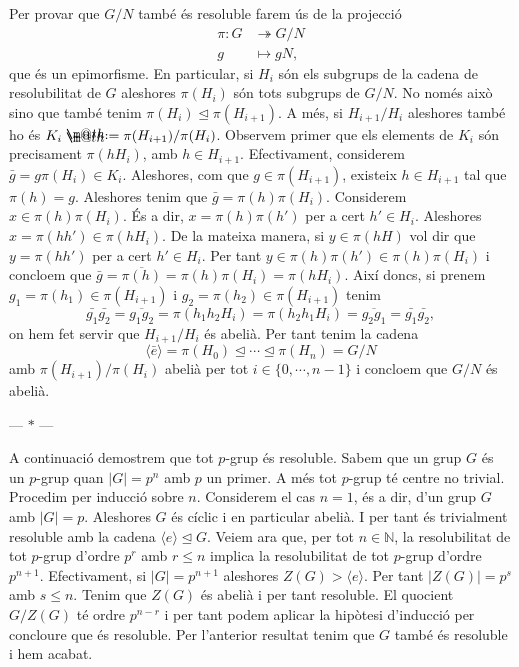 \documentclass[12pt]{article}
\makeatletter
\newcommand{\N}{\mathbb{N}}
\newcommand{\gen}[1]{\langle #1 \rangle}
\newcommand{\abs}[1]{\left\lvert #1 \right\rvert}
\newcommand{\normal}{\trianglelefteq}
\newcommand{\parbreak}{
	\begin{center}
		--- $\ast$ ---
	\end{center} 
}
\newcommand*{\defeq}{\mathrel{\rlap{%
    \raisebox{0.3ex}{$\m@th\cdot$}}%
  \raisebox{-0.3ex}{$\m@th\cdot$}}%
=}
\makeatother
\begin{document}
Per provar que \( G/N \) també és resoluble farem ús de la projecció
\begin{align*}
	\pi \colon G & \twoheadrightarrow G/N \\
	g & \mapsto gN,
\end{align*}
que és un epimorfisme. En particular, si \( H_i \) són els subgrups de la cadena de resolubilitat de \( G \) aleshores \( \pi(H_i) \) són tots subgrups de \( G/N \). No només això sino que també tenim \( \pi(H_i) \normal \pi(H_{i+1}) \). A més, si \( H_{i+1}/H_i \) aleshores també ho és \( K_i \defeq \pi(H_{i+1})/\pi(H_i) \). Observem primer que els elements de \( K_i \) són precisament \( \pi(hH_i) \), amb \( h \in H_{i+1} \). Efectivament, considerem \( \bar{g} = g\pi(H_i) \in K_i \). Aleshores, com que \( g \in \pi(H_{i+1}) \), existeix \( h \in H_{i+1} \) tal que \( \pi(h) = g \). Aleshores tenim que \( \bar{g} = \pi(h) \pi(H_i) \). Considerem \( x \in \pi(h) \pi(H_i) \). És a dir, \( x = \pi(h)\pi(h') \)	per a cert \( h' \in H_i \). Aleshores \( x = \pi(hh') \in \pi(hH_i) \). De la mateixa manera, si \( y \in \pi(hH) \) vol dir que \( y = \pi(hh') \) per a cert \( h' \in H_i \). Per tant \( y \in \pi(h)\pi(h') \in \pi(h)\pi(H_i) \) i concloem que \( \bar{g} = \overline{\pi(h)} = \pi(h)\pi(H_i) = \pi(hH_i) \). Així doncs, si prenem \( g_1 = \pi(h_1) \in \pi(H_{i+1}) \) i \( g_2 = \pi(h_2) \in \pi(H_{i+1}) \) tenim
\begin{equation*}
	\bar{g_1}\bar{g_2} = \overline{g_1 g_2} = \pi(h_1h_2H_{i}) = \pi(h_2 h_1 H_i) = \overline{g_2 g_1} = \bar{g_1}\bar{g_2},
\end{equation*}
on hem fet servir que \( H_{i+1}/H_i \) és abelià. Per tant tenim la cadena
\begin{equation*}
	\gen{\bar{e}} = \pi(H_0) \normal \cdots \normal \pi(H_n) = G/N
\end{equation*}
amb \( \pi(H_{i+1}) / \pi(H_i) \) abelià per tot \( i \in \{0, \cdots, n-1\} \) i concloem que \( G/N \) és abelià. 

\parbreak

A continuació demostrem que tot \( p \)-grup és resoluble. Sabem que un grup \( G \) és un \( p \)-grup	quan \( \abs{G} = p^n \) amb \( p \) un primer. A més tot \( p \)-grup té centre no trivial. Procedim per inducció sobre \( n \). Considerem el cas \( n = 1 \), és a dir, d'un grup \( G \) amb \( \abs{G} = p \). Aleshores \( G \) és cíclic i en particular abelià. I per tant és trivialment resoluble amb la cadena \( \gen{e} \normal G \). Veiem ara que, per tot \( n \in \N \), la resolubilitat de tot \( p \)-grup d'ordre \( p^r \) amb \( r \leq n \) implica la resolubilitat de tot \( p \)-grup d'ordre \( p^{n+1} \). Efectivament, si \( \abs{G} = p^{n+1} \) aleshores \( Z(G) > \gen{e} \). Per tant \( \abs{Z(G)} = p^s \) amb \( s \leq n \). Tenim que \( Z(G) \) és abelià i per tant resoluble. El quocient \( G/Z(G) \) té ordre \( p^{n-r} \) i per tant podem aplicar la hipòtesi d'inducció per concloure que és resoluble. Per l'anterior resultat tenim que \( G \) també és resoluble i hem acabat.
\end{document}
